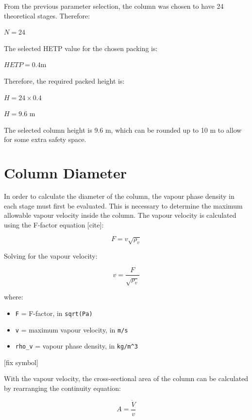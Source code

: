 From the previous parameter selection, the column was chosen to have 24
theoretical stages. Therefore:

\(N = 24\)

The selected HETP value for the chosen packing is:

\(HETP = 0.4 \text{m}\)

Therefore, the required packed height is:

\(H = 24 \times 0.4\)

\(H = 9.6 \text{ m}\)

The selected column height is 9.6 m, which can be rounded up to 10 m to
allow for some extra safety space.

\section{Column Diameter}\label{column-diameter}

In order to calculate the diameter of the column, the vapour phase
density in each stage must first be evaluated. This is necessary to
determine the maximum allowable vapour velocity inside the column. The
vapour velocity is calculated using the F-factor equation {[}cite{]}:

\begin{equation}{ F = v \sqrt{\rho_v} }\end{equation}

Solving for the vapour velocity:

\begin{equation}{ v = \frac{F}{\sqrt{\rho_v}} }\end{equation}

where:

\begin{itemize}
\tightlist
\item
  \texttt{F} = F-factor, in \texttt{sqrt(Pa)}
\item
  \texttt{v} = maximum vapour velocity, in \texttt{m/s}
\item
  \texttt{rho\_v} = vapour phase density, in \texttt{kg/m\^{}3}
\end{itemize}

{[}fix symbol{]}

With the vapour velocity, the cross-sectional area of the column can be
calculated by rearranging the continuity equation:

\begin{equation}{ A = \frac{\dot{V}}{v} }\end{equation}

